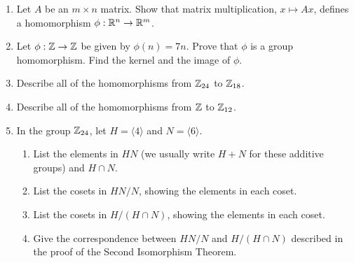 {\begin{enumerate}
\begin{enumerate}
 \bf\item\rm 
Show that $U$ is a subgroup of $T$.
 
 \bf\item\rm 
Prove that $U$ is abelian.
 
 \bf\item\rm 
Prove that $U$ is normal in $T$.
 
 \bf\item\rm  
Show that $T/U$ is abelian.
 
 \bf\item\rm
Is $T$ normal in $GL_2( {\Bbb R})$?
 
\end{enumerate}
 
 
\bf\item\rm
Let $A$ be an $m \times n$ matrix.  Show that matrix multiplication,
$x \mapsto Ax$, defines a homomorphism $\phi : {\Bbb R}^n \rightarrow
{\Bbb R}^m$. 
 
 
\bf\item\rm
Let $\phi : {\Bbb Z} \rightarrow {\Bbb Z}$ be given by $\phi(n) = 7n$.
Prove that $\phi$ is a group homomorphism. Find the kernel and the
image of $\phi$.
 
 
\bf\item\rm
Describe all of the homomorphisms from ${\Bbb Z}_{24}$ to ${\Bbb
Z}_{18}$. 
 
 
\bf\item\rm
Describe all of the homomorphisms from ${\Bbb Z}$ to ${\Bbb Z}_{12}$. 
 
 
\bf\item\rm
In the group ${\Bbb Z}_{24}$, let $H = \langle 4 \rangle$ and $N =
\langle 6 \rangle$. 
\begin{enumerate}
 
 \bf\item\rm
List the elements in $HN$ (we usually write $H + N$ for these additive
groups) and $H \cap N$. 
 
 \bf\item\rm
List the cosets in $HN/N$, showing the elements in each coset.
 
 \bf\item\rm
List the cosets in $H/(H \cap N)$, showing the elements in each coset. 
 
 \bf\item\rm
Give the correspondence between $HN/N$ and $H/(H \cap N)$ described in
the proof of the Second Isomorphism Theorem. 
 
\end{enumerate}
 

\end{enumerate}}
